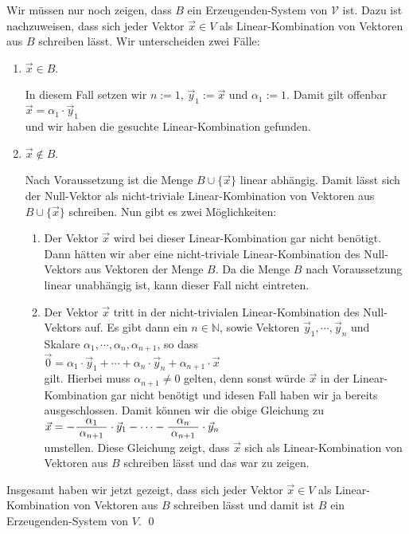 \proof
Wir m\"{u}ssen nur noch zeigen, dass $B$ ein Erzeugenden-System von $\mathcal{V}$ ist.  Dazu ist nachzuweisen,
dass sich jeder Vektor $\vec{x} \in V$ als Linear-Kombination von Vektoren aus $B$ schreiben
l\"{a}sst.  Wir unterscheiden zwei F\"{a}lle:
\begin{enumerate}
\item $\vec{x} \in B$.

      In diesem Fall setzen wir $n := 1$, $\vec{y}_1 := \vec{x}$ und $\alpha_1 := 1$.  Damit
      gilt offenbar
      \\[0.2cm]
      \hspace*{1.3cm}
      $\vec{x} = \alpha_1 \cdot \vec{y}_1$
      \\[0.2cm]
      und wir haben die gesuchte Linear-Kombination gefunden.
\item $\vec{x} \not\in B$.

      Nach Voraussetzung ist die Menge $B \cup \{ \vec{x} \}$ linear abh\"{a}ngig.  Damit l\"{a}sst sich
      der Null-Vektor als nicht-triviale Linear-Kombination von Vektoren aus $B \cup \{\vec{x}\}$
      schreiben.  Nun gibt es zwei M\"{o}glichkeiten:
      \begin{enumerate}
      \item Der Vektor $\vec{x}$ wird bei dieser Linear-Kombination gar nicht ben\"{o}tigt.
            Dann h\"{a}tten wir aber eine nicht-triviale Linear-Kombination des Null-Vektors aus
            Vektoren der Menge $B$.  Da die Menge $B$ nach Voraussetzung linear unabh\"{a}ngig ist,
            kann dieser Fall nicht eintreten.
      \item Der Vektor $\vec{x}$ tritt in der nicht-trivialen Linear-Kombination des
            Null-Vektors auf.  Es gibt dann ein $n \in \mathbb{N}$, sowie Vektoren $\vec{y}_1,
            \cdots, \vec{y}_n$ und Skalare $\alpha_1, \cdots, \alpha_n, \alpha_{n+1}$,
            so dass 
            \\[0.2cm]
            \hspace*{1.3cm}
            $\vec{0} = \alpha_1 \cdot \vec{y}_1 + \cdots + \alpha_n \cdot \vec{y}_n + \alpha_{n+1} \cdot \vec{x}$
            \\[0.2cm]
            gilt.  Hierbei muss $\alpha_{n+1} \not=0$ gelten, denn sonst w\"{u}rde $\vec{x}$ in der
            Linear-Kombination gar nicht ben\"{o}tigt und idesen Fall haben wir ja bereits
            ausgeschlossen.  Damit 
            k\"{o}nnen wir die obige Gleichung zu
            \\[0.2cm]
            \hspace*{1.3cm}
            $\vec{x} = -\bruch{\alpha_1}{\alpha_{n+1}} \cdot \vec{y}_1 - \cdots - \bruch{\alpha_n}{\alpha_{n+1}} \cdot \vec{y}_n$
            \\[0.2cm] 
            umstellen.  Diese Gleichung zeigt, dass $\vec{x}$ sich als Linear-Kombination von Vektoren aus
            $B$ schreiben l\"{a}sst und das war zu zeigen. 
      \end{enumerate}
\end{enumerate}
Insgesamt haben wir jetzt gezeigt, dass sich jeder Vektor $\vec{x}\in V$ als Linear-Kombination
von Vektoren aus $B$ schreiben l\"{a}sst und damit ist $B$ ein Erzeugenden-System von $V$.  \qed


